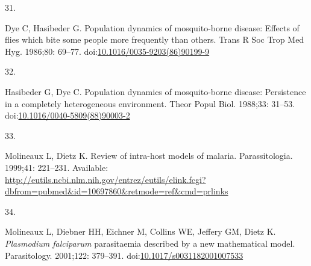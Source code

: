 \documentclass[
]{book}
\newlength{\cslhangindent}
\newlength{\csllabelwidth}
\newlength{\cslentryspacingunit} %
\newenvironment{CSLReferences}[2] %
 {%
  \setlength{\parindent}{0pt}
  \ifodd #1
  \let\oldpar\par
  \def\par{\hangindent=\cslhangindent\oldpar}
  \fi
  \setlength{\parskip}{#2\cslentryspacingunit}
 }%
 {}
\newcommand{\CSLLeftMargin}[1]{\parbox[t]{\csllabelwidth}{#1}}
\newcommand{\CSLRightInline}[1]{\parbox[t]{\linewidth - \csllabelwidth}{#1}\break}
\begin{document}
\begin{CSLReferences}{0}{0}
\leavevmode{}%
\CSLLeftMargin{31. }%
\CSLRightInline{Dye C, Hasibeder G. Population dynamics of mosquito-borne disease: Effects of flies which bite some people more frequently than others. Trans R Soc Trop Med Hyg. 1986;80: 69--77. doi:\href{https://doi.org/10.1016/0035-9203(86)90199-9}{10.1016/0035-9203(86)90199-9}}

\leavevmode{}%
\CSLLeftMargin{32. }%
\CSLRightInline{Hasibeder G, Dye C. Population dynamics of mosquito-borne disease: Persistence in a completely heterogeneous environment. Theor Popul Biol. 1988;33: 31--53. doi:\href{https://doi.org/10.1016/0040-5809(88)90003-2}{10.1016/0040-5809(88)90003-2}}

\leavevmode{}%
\CSLLeftMargin{33. }%
\CSLRightInline{Molineaux L, Dietz K. Review of intra-host models of malaria. Parassitologia. 1999;41: 221--231. Available: \url{http://eutils.ncbi.nlm.nih.gov/entrez/eutils/elink.fcgi?dbfrom=pubmed\&id=10697860\&retmode=ref\&cmd=prlinks}}

\leavevmode{}%
\CSLLeftMargin{34. }%
\CSLRightInline{Molineaux L, Diebner HH, Eichner M, Collins WE, Jeffery GM, Dietz K. \emph{Plasmodium falciparum} parasitaemia described by a new mathematical model. Parasitology. 2001;122: 379--391. doi:\href{https://doi.org/10.1017/s0031182001007533}{10.1017/s0031182001007533}}

\end{CSLReferences}
\end{document}
